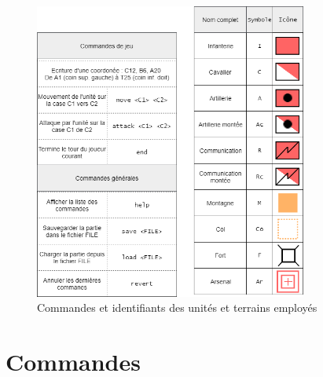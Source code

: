 \documentclass[a4paper]{report}
\begin{document}
\begin{figure}[h]
\centering
\includegraphics[width=0.8\textwidth]{interface_pdp}
\caption{Commandes et identifiants des unités et terrains employés}
\label{fig:commands}
\end{figure}

\section{Commandes}

\end{document}
